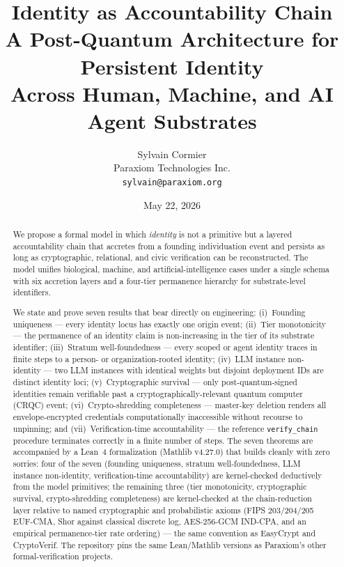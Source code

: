 \documentclass[11pt,a4paper,parskip=half-,DIV=12,headings=standardclasses]{scrartcl}
\title{
  \sffamily\bfseries
  Identity as Accountability Chain\\[0.4ex]
  \large\mdseries A Post-Quantum Architecture for Persistent Identity\\
  Across Human, Machine, and AI Agent Substrates
}
\author{
  \normalsize Sylvain Cormier\\
  \footnotesize Paraxiom Technologies Inc.\\
  \footnotesize \texttt{sylvain@paraxiom.org}
}
\date{\small May 22, 2026}
\theoremstyle{ncthm}
\theoremstyle{ncdef}
\begin{document}

\maketitle

\begin{abstract}
\noindent
We propose a formal model in which \emph{identity} is not a primitive
but a layered accountability chain that accretes from a founding
individuation event and persists as long as cryptographic, relational,
and civic verification can be reconstructed. The model unifies
biological, machine, and artificial-intelligence cases under a single
schema with six accretion layers and a four-tier permanence hierarchy
for substrate-level identifiers.

We state and prove seven results that bear directly on engineering:
(i)~Founding uniqueness --- every identity locus has exactly one
origin event; (ii)~Tier monotonicity --- the permanence of an
identity claim is non-increasing in the tier of its substrate
identifier; (iii)~Stratum well-foundedness --- every scoped or agent
identity traces in finite steps to a person- or organization-rooted
identity; (iv)~LLM instance non-identity --- two LLM instances with
identical weights but disjoint deployment IDs are distinct identity
loci; (v)~Cryptographic survival --- only post-quantum-signed
identities remain verifiable past a cryptographically-relevant
quantum computer (CRQC) event; (vi)~Crypto-shredding completeness ---
master-key deletion renders all envelope-encrypted credentials
computationally inaccessible without recourse to unpinning; and
(vii)~Verification-time accountability --- the reference
\texttt{verify\_chain} procedure terminates correctly in a finite
number of steps. The seven theorems are accompanied by a Lean~4
formalization \cite{cormier-identity-arch-lean-2026} (Mathlib
v4.27.0) that builds cleanly with zero sorries: four of the seven
(founding uniqueness, stratum well-foundedness, LLM instance
non-identity, verification-time accountability) are kernel-checked
deductively from the model primitives; the remaining three (tier
monotonicity, cryptographic survival, crypto-shredding completeness)
are kernel-checked at the chain-reduction layer relative to named
cryptographic and probabilistic axioms (FIPS 203/204/205 EUF-CMA,
Shor against classical discrete log, AES-256-GCM IND-CPA, and an
empirical permanence-tier rate ordering) --- the same convention as
EasyCrypt and CryptoVerif. The repository pins the same
Lean/Mathlib versions as Paraxiom's other formal-verification
projects.


\end{abstract}
\end{document}
